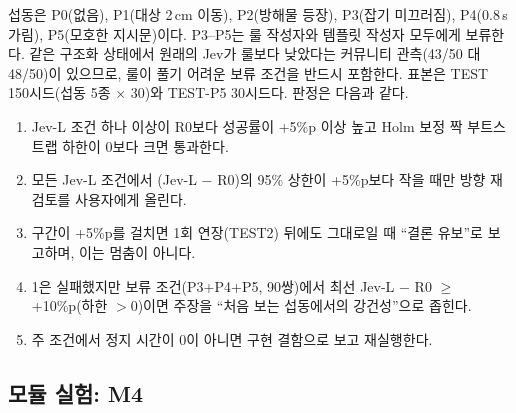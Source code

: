 섭동은 P0(없음), P1(대상 2\,cm 이동), P2(방해물 등장), P3(잡기 미끄러짐), P4(0.8\,s 가림), P5(모호한 지시문)이다. P3--P5는 룰 작성자와 템플릿 작성자 모두에게 보류한다. 같은 구조화 상태에서 원래의 Jev가 룰보다 낮았다는 커뮤니티 관측(43/50 대 48/50)이 있으므로, 룰이 풀기 어려운 보류 조건을 반드시 포함한다. 표본은 TEST 150시드(섭동 5종 $\times$ 30)와 TEST-P5 30시드다. 판정은 다음과 같다.
\begin{enumerate}
  \item Jev-L 조건 하나 이상이 R0보다 성공률이 +5\%p 이상 높고 Holm 보정 짝 부트스트랩 하한이 0보다 크면 통과한다.
  \item 모든 Jev-L 조건에서 (Jev-L $-$ R0)의 95\% 상한이 +5\%p보다 작을 때만 방향 재검토를 사용자에게 올린다.
  \item 구간이 +5\%p를 걸치면 1회 연장(TEST2) 뒤에도 그대로일 때 ``결론 유보''로 보고하며, 이는 멈춤이 아니다.
  \item 1은 실패했지만 보류 조건(P3+P4+P5, 90쌍)에서 최선 Jev-L $-$ R0 $\ge$ +10\%p(하한 $>0$)이면 주장을 ``처음 보는 섭동에서의 강건성''으로 좁힌다.
  \item 주 조건에서 정지 시간이 0이 아니면 구현 결함으로 보고 재실행한다.
\end{enumerate}

\subsection{모듈 실험: M4}

